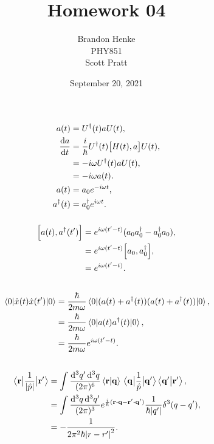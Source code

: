 \documentclass[a4paper,12pt,twoside]{article}
\title{Homework 04}
\author{Brandon Henke\\PHY851\\Scott Pratt}
\date{September 20, 2021}
\begin{document}

\maketitle

\setcounter{section}{2}
\setcounter{subsection}{12}
\subsection{}%
\subsubsection{}
\begin{align}
	a(t) &= U^\dagger(t) a U(t),\\
	\dv{a}{t} &= \frac{i}{\hbar} U^\dagger(t) \comm{H(t)}{a}U(t),\\
	&= -i\omega U^\dagger(t) a U(t),\\
	&= -i\omega a(t).\\
	a(t) &= a_0 e^{-i\omega t},\\
	a^\dagger(t) &= a_0^\dagger e^{i\omega t}.
\end{align}
\subsubsection{}
\begin{align}
	\comm{a(t)}{a^\dagger(t')} &= e^{i\omega(t'-t)}(a_0a_0^\dagger - a_0^\dagger a_0),\\
	&= e^{i\omega(t'-t)} \comm{a_0}{a_0^\dagger},\\
	&= e^{i\omega(t'-t)}.
\end{align}
\subsection{}%
\begin{align}
	\ev{\hat{x}(t)\hat{x}(t')}{0} &= \frac{\hbar}{2m\omega} \ev{(a(t)+a^\dagger(t))(a(t)+a^\dagger(t))}{0},\\
	&= \frac{\hbar}{2m\omega} \ev{a(t)a^\dagger(t)}{0},\\
	&= \frac{\hbar}{2m\omega} e^{i\omega(t'-t)}.
\end{align}
\subsection{}%
\begin{align}
	\mel{\vb{r}}{\frac{1}{\abs{\hat{p}}}}{\vb{r}'}
	&= \int \frac{\dd[3]{q'}\dd[3]{q}}{(2\pi)^6} \ip{\vb{r}}{\vb{q}}\mel{\vb{q}}{\frac{1}{\hat{p}}}{\vb{q}'}\ip{\vb{q}'}{\vb{r}'},\\
	&= \int \frac{\dd[3]{q}\dd[3]{q'}}{(2\pi)^3} e^{\frac{i}{\hbar}(\vb{r}\vdot\vb{q}-\vb{r}'\vdot\vb{q}')} \frac{1}{\hbar\abs{q'}}\delta^3(q-q'),\\
	&= -\frac{1}{2\pi^2 \hbar \abs{r-r'}^2}.
\end{align}
\end{document}
